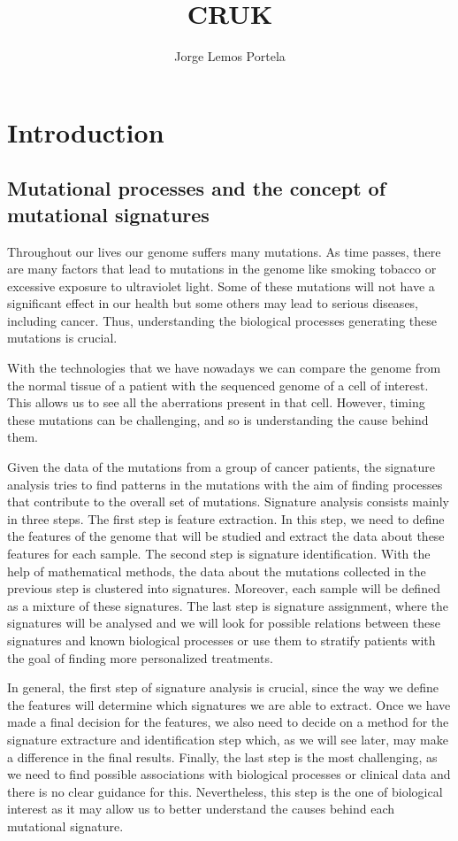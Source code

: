 \documentclass[a4paper]{article}
\title{CRUK}
\author{Jorge Lemos Portela}
\begin{document}
\maketitle
\tableofcontents
\clearpage

\section{Introduction}
\subsection{Mutational processes and the concept of mutational signatures}
Throughout our lives our genome suffers many mutations. As time passes, there are many factors that lead to mutations in the genome like smoking tobacco or excessive exposure to ultraviolet light. Some of these mutations will not have a significant effect in our health but some others may lead to serious diseases, including cancer. Thus, understanding the biological processes generating these mutations is crucial.

With the technologies that we have nowadays we can compare the genome from the normal tissue of a patient with the sequenced genome of a cell of interest. This allows us to see all the aberrations present in that cell. However, timing these mutations can be challenging, and so is understanding the cause behind them.

Given the data of the mutations from a group of cancer patients, the signature analysis tries to find patterns in the mutations with the aim of finding processes that contribute to the overall set of mutations. Signature analysis consists mainly in three steps. The first step is feature extraction. In this step, we need to define the features of the genome that will be studied and extract the data about these features for each sample. The second step is signature identification. With the help of mathematical methods, the data about the mutations collected in the previous step is clustered into signatures. Moreover, each sample will be defined as a mixture of these signatures. The last step is signature assignment, where the signatures will be analysed and we will look for possible relations between these signatures and known biological processes or use them to stratify patients with the goal of finding more personalized treatments. 

In general, the first step of signature analysis is crucial, since the way we define the features will determine which signatures we are able to extract. Once we have made a final decision for the features, we also need to decide on a method for the signature extracture and identification step which, as we will see later, may make a difference in the final results. Finally, the last step is the most challenging, as we need to find possible associations with biological processes or clinical data and there is no clear guidance for this. Nevertheless, this step is the one of biological interest as it may allow us to better understand the causes behind each mutational signature. 
\end{document}
